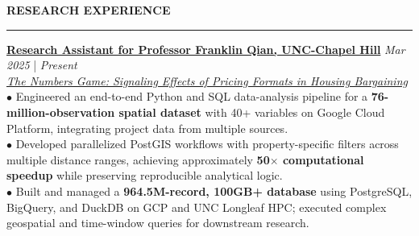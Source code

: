 \documentclass{../../../original_CV/resume}
\renewcommand{\sectionskip}{\vspace{0.10cm}}
\renewcommand{\sectionlineskip}{\vspace{0.10cm}}
\renewenvironment{rSection}[1]{
\sectionskip
\textcolor{UC San Diego Blue}{\textbf{\large\bfseries\MakeUppercase{#1}}}
\sectionlineskip
\hrule
\begin{list}{}{
\setlength{\leftmargin}{0em}
}
\item[]
}{
\end{list}
}
\begin{document}
\begin{rSection}{RESEARCH EXPERIENCE}
\noindent
\textbf{\href{https://github.com/YuankaiTao-super/Construction-of-Comparable-Housing-Variables}{Research Assistant for Professor Franklin Qian, UNC-Chapel Hill}} \hfill {\em Mar 2025} | {\em Present}\\
\textit{\href{https://papers.ssrn.com/sol3/papers.cfm?abstract_id=4406954}{The Numbers Game: Signaling Effects of Pricing Formats in Housing Bargaining}}\\[4pt]
$\bullet$ Engineered an end-to-end Python and SQL data-analysis pipeline for a \textbf{76-million-observation spatial dataset} with 40+ variables on Google Cloud Platform, integrating project data from multiple sources.\\[1.5pt]
$\bullet$ Developed parallelized PostGIS workflows with property-specific filters across multiple distance ranges, achieving approximately \textbf{50$\times$ computational speedup} while preserving reproducible analytical logic.\\[1.5pt]
$\bullet$ Built and managed a \textbf{964.5M-record, 100GB+ database} using PostgreSQL, BigQuery, and DuckDB on GCP and UNC Longleaf HPC; executed complex geospatial and time-window queries for downstream research.
\end{rSection}
\end{document}
